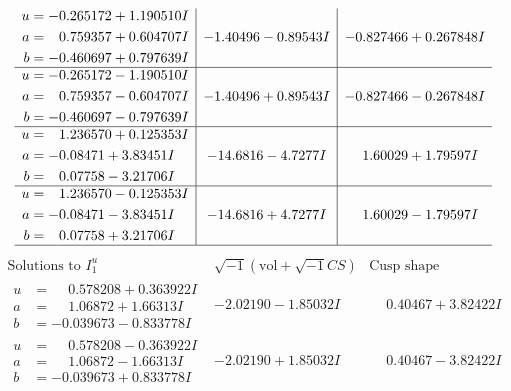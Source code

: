 \documentclass[1p]{elsarticle_modified}
\theoremstyle{definition}
\newcommand{\I}{\sqrt{-1}}
\begin{document}
$$\begin{array}{c|c|c}
\begin{aligned}
u &= -0.265172 + 1.190510 I \\
a &= \phantom{-}0.759357 + 0.604707 I \\
b &= -0.460697 + 0.797639 I\end{aligned}
 & -1.40496 - 0.89543 I & -0.827466 + 0.267848 I \\ \hline\begin{aligned}
u &= -0.265172 - 1.190510 I \\
a &= \phantom{-}0.759357 - 0.604707 I \\
b &= -0.460697 - 0.797639 I\end{aligned}
 & -1.40496 + 0.89543 I & -0.827466 - 0.267848 I \\ \hline\begin{aligned}
u &= \phantom{-}1.236570 + 0.125353 I \\
a &= -0.08471 + 3.83451 I \\
b &= \phantom{-}0.07758 - 3.21706 I\end{aligned}
 & -14.6816 - 4.7277 I & \phantom{-}1.60029 + 1.79597 I \\ \hline\begin{aligned}
u &= \phantom{-}1.236570 - 0.125353 I \\
a &= -0.08471 - 3.83451 I \\
b &= \phantom{-}0.07758 + 3.21706 I\end{aligned}
 & -14.6816 + 4.7277 I & \phantom{-}1.60029 - 1.79597 I\\
 \hline 
 \end{array}$$\newpage$$\begin{array}{c|c|c}  
\text{Solutions to }I^u_{1}& \I (\text{vol} + \sqrt{-1}CS) & \text{Cusp shape}\\
 \hline 
\begin{aligned}
u &= \phantom{-}0.578208 + 0.363922 I \\
a &= \phantom{-}1.06872 + 1.66313 I \\
b &= -0.039673 - 0.833778 I\end{aligned}
 & -2.02190 - 1.85032 I & \phantom{-}0.40467 + 3.82422 I \\ \hline\begin{aligned}
u &= \phantom{-}0.578208 - 0.363922 I \\
a &= \phantom{-}1.06872 - 1.66313 I \\
b &= -0.039673 + 0.833778 I\end{aligned}
 & -2.02190 + 1.85032 I & \phantom{-}0.40467 - 3.82422 I \\ \hline\begin{aligned}

\end{aligned}
\end{array}$$
\end{document}
